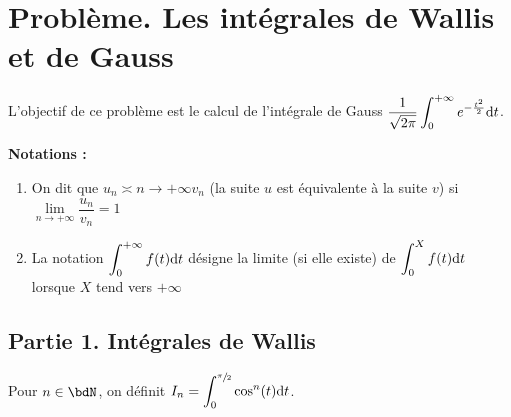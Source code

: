 \documentclass[a4paper,french,bookmarks]{article}
\begin{document}

\section*{Problème. Les intégrales de Wallis et de Gauss}

L'objectif de ce problème est le calcul de l'intégrale de Gauss $\displaystyle \dfrac{1}{\sqrt{2\pi}}\int_0^{+\infty} e^{-\frac{t^2}{2}} \text dt$.

\textbf{Notations :}
\begin{enumerate}
    \item[\bullet] On dit que $ u_n \asymp{n \to +\infty} v_n$ (la suite $u$ est équivalente à la suite $v$) si $\lim\limits_{n \to +\infty} \dfrac{u_n}{v_n} = 1$
    \item[\bullet] La notation $\displaystyle \int_0^{+\infty} f(t)\text dt$ désigne la limite (si elle existe) de $\displaystyle \int_0^X f(t)\text dt$ lorsque $X$ tend vers $+\infty$
    
\end{enumerate}

\subsection*{Partie 1. Intégrales de Wallis}

Pour $n \in \bdN$, on définit $\displaystyle I_n = \int_0^{\sfrac{\pi}{2}} \cos^n(t) \text dt$.
\end{document}
